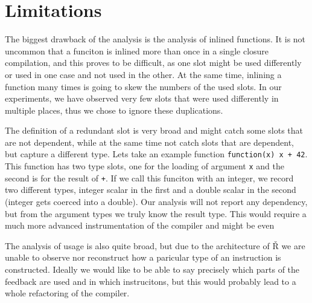 
\section{Limitations}

The biggest drawback of the analysis is the analysis of inlined functions. It is not uncommon that a funciton is inlined more than once in a single closure compilation, and this proves to be difficult, as one slot might be used differently or used in one case and not used in the other. At the same time, inlining a function many times is going to skew the numbers of the used slots. In our experiments, we have observed very few slots that were used differently in multiple places, thus we chose to ignore these duplications.

The definition of a redundant slot is very broad and might catch some slots that are not dependent, while at the same time not catch slots that are dependent, but capture a different type. Lets take an example function \texttt{function(x) x + 42}. This function has two type slots, one for the loading of argument \texttt{x} and the second is for the result of \texttt{+}. If we call this funciton with an integer, we record two different types, integer scalar in the first and a double scalar in the second (integer gets coerced into a double). Our analysis will not report any dependency, but from the argument types we truly know the result type. This would require a much more advanced instrumentation of the compiler and might be even

The analysis of usage is also quite broad, but due to the architecture of Ř we are unable to observe nor reconstruct how a paricular type of an instruction is constructed. Ideally we would like to be able to say precisely which parts of the feedback are used and in which instrucitons, but this would probably lead to a whole refactoring of the compiler.

